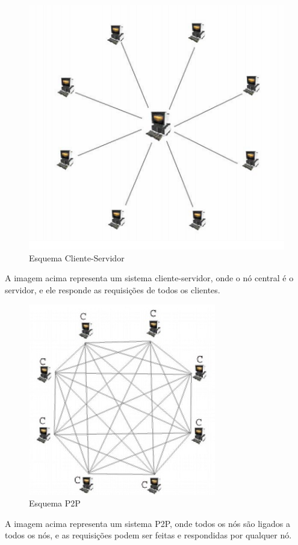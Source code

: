 \documentclass[a4paper]{article}
\begin{document}
\begin{figure}[!hb]
\begin{center}
  \includegraphics{img//cliente-servidor.png}
  \caption{Esquema Cliente-Servidor\cite{sisp2p}} 
\end{center}
\end{figure}
A imagem acima representa um sistema cliente-servidor, onde o nó central é o servidor, e ele responde as requisições de todos os clientes.

\begin{figure} [!ht]
\begin{center}
  \includegraphics{img//p2p.png}
  \caption{Esquema P2P \cite{sisp2p}} 
\end{center}
\end{figure}
A imagem acima representa um sistema P2P, onde todos os nós são ligados a todos os nós, e as requisições podem ser feitas e respondidas por qualquer nó.
\end{document}
